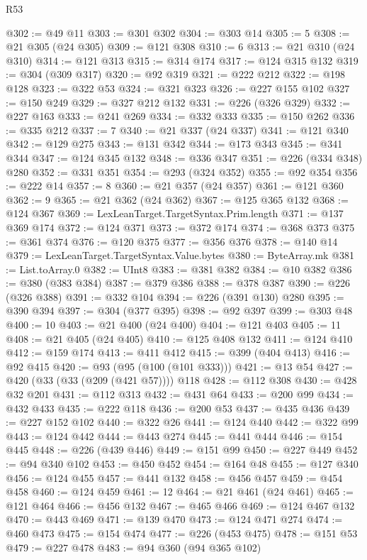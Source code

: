 \begin{lexlean}{R53}
\begin{coremodule}
@302 := @49 @11
@303 := @301 @302
@304 := @303 @14
@305 := 5
@308 := @21 @305 (@24 @305)
@309 := @121 @308
@310 := 6
@313 := @21 @310 (@24 @310)
@314 := @121 @313
@315 := @314 @174
@317 := @124 @315 @132
@319 := @304 (@309 @317)
@320 := @92 @319
@321 := @222 @212
@322 := @198 @128
@323 := @322 @53
@324 := @321 @323
@326 := @227 @155 @102
@327 := @150 @249
@329 := @327 @212 @132
@331 := @226 (@326 @329)
@332 := @227 @163
@333 := @241 @269
@334 := @332 @333
@335 := @150 @262
@336 := @335 @212
@337 := 7
@340 := @21 @337 (@24 @337)
@341 := @121 @340
@342 := @129 @275
@343 := @131 @342
@344 := @173 @343
@345 := @341 @344
@347 := @124 @345 @132
@348 := @336 @347
@351 := @226 (@334 @348) @280
@352 := @331 @351
@354 := @293 (@324 @352)
@355 := @92 @354
@356 := @222 @14
@357 := 8
@360 := @21 @357 (@24 @357)
@361 := @121 @360
@362 := 9
@365 := @21 @362 (@24 @362)
@367 := @125 @365 @132
@368 := @124 @367
@369 := LexLeanTarget.TargetSyntax.Prim.length
@371 := @137 @369 @174
@372 := @124 @371
@373 := @372 @174
@374 := @368 @373
@375 := @361 @374
@376 := @120 @375
@377 := @356 @376
@378 := @140 @14
@379 := LexLeanTarget.TargetSyntax.Value.bytes
@380 := ByteArray.mk
@381 := List.toArray.{0}
@382 := UInt8
@383 := @381 @382
@384 := @10 @382
@386 := @380 (@383 @384)
@387 := @379 @386
@388 := @378 @387
@390 := @226 (@326 @388)
@391 := @332 @104
@394 := @226 (@391 @130) @280
@395 := @390 @394
@397 := @304 (@377 @395)
@398 := @92 @397
@399 := @303 @48
@400 := 10
@403 := @21 @400 (@24 @400)
@404 := @121 @403
@405 := 11
@408 := @21 @405 (@24 @405)
@410 := @125 @408 @132
@411 := @124 @410
@412 := @159 @174
@413 := @411 @412
@415 := @399 (@404 @413)
@416 := @92 @415
@420 := @93 (@95 (@100 (@101 @333)))
@421 := @13 @54
@427 := @420 (@33 (@33 (@209 (@421 @57)))) @118
@428 := @112 @308
@430 := @428 @32 @201
@431 := @112 @313
@432 := @431 @64
@433 := @200 @99
@434 := @432 @433
@435 := @222 @118
@436 := @200 @53
@437 := @435 @436
@439 := @227 @152 @102
@440 := @322 @26
@441 := @124 @440
@442 := @322 @99
@443 := @124 @442
@444 := @443 @274
@445 := @441 @444
@446 := @154 @445
@448 := @226 (@439 @446)
@449 := @151 @99
@450 := @227 @449
@452 := @94 @340 @102
@453 := @450 @452
@454 := @164 @48
@455 := @127 @340
@456 := @124 @455
@457 := @441 @132
@458 := @456 @457
@459 := @454 @458
@460 := @124 @459
@461 := 12
@464 := @21 @461 (@24 @461)
@465 := @121 @464
@466 := @456 @132
@467 := @465 @466
@469 := @124 @467 @132
@470 := @443 @469
@471 := @139 @470
@473 := @124 @471 @274
@474 := @460 @473
@475 := @154 @474
@477 := @226 (@453 @475)
@478 := @151 @53
@479 := @227 @478
@483 := @94 @360 (@94 @365 @102)

\end{coremodule}
\end{lexlean}
